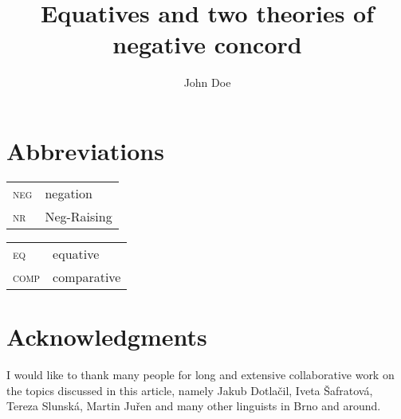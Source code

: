 \documentclass[output=paper,colorlinks,citecolor=brown]{langscibook}
\author{John Doe}
\title{Equatives and two theories of negative concord}
\begin{document}
\maketitle



% 

\section*{Abbreviations}

\begin{tabularx}{.5\textwidth}{@{}lQ}
\textsc{neg}&negation\\
\textsc{nr}&Neg-Raising\\
\end{tabularx}%
\begin{tabularx}{.5\textwidth}{lQ@{}}
\textsc{eq}&equative\\
\textsc{comp}&comparative\\
\end{tabularx}

\section*{Acknowledgments}\label{sec:acknowl}
I would like to thank many people for long and extensive collaborative work on the topics discussed in this article, namely Jakub Dotlačil, Iveta Šafratová, Tereza Slunská, Martin Juřen and many other linguists in Brno and around.  

\printbibliography[heading=subbibliography,notkeyword=this] 
\end{document}
